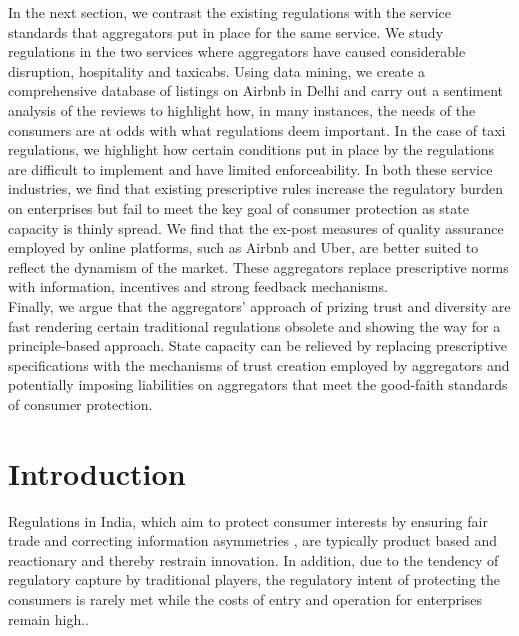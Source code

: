 \documentclass[a4paper, 12pt]{article}
\begin{document}
                  In the next section, we contrast the existing regulations with the service standards that aggregators put in place for the same service. We study regulations in the two services where aggregators have caused considerable disruption, hospitality and taxicabs. Using data mining, we create a comprehensive database of listings on Airbnb in Delhi and carry out a sentiment analysis of the reviews to highlight how, in many instances, the needs of the consumers are at odds with what regulations deem important. In the case of taxi regulations, we highlight how certain conditions put in place by the regulations are difficult to implement and have limited enforceability. In both these service industries, we find that existing prescriptive rules increase the regulatory burden on enterprises but fail to meet the key goal of consumer protection as state capacity is thinly spread. We find that the ex-post measures of quality assurance employed by online platforms, such as Airbnb and Uber, are better suited to reflect the dynamism of the market. These aggregators replace prescriptive norms with information, incentives and strong feedback mechanisms.    \\
                    
                 Finally, we argue that the aggregators' approach of prizing trust and diversity are fast rendering certain traditional regulations obsolete and showing the way for a principle-based approach. State capacity can be relieved by replacing prescriptive specifications with the mechanisms of trust creation employed by aggregators and potentially imposing liabilities on aggregators that meet the good-faith standards of consumer protection. 

        
                    
            \newpage
                    \section{Introduction}
                 Regulations in India, which aim to protect consumer interests by ensuring fair trade and correcting information asymmetries \parencite{dudley2012regulation}, are typically product based and reactionary and thereby restrain innovation. In addition, due to the tendency of regulatory capture by traditional players, the regulatory intent of protecting the consumers is rarely met while the costs of entry and operation for enterprises remain high.. \\
                    
\end{document}
